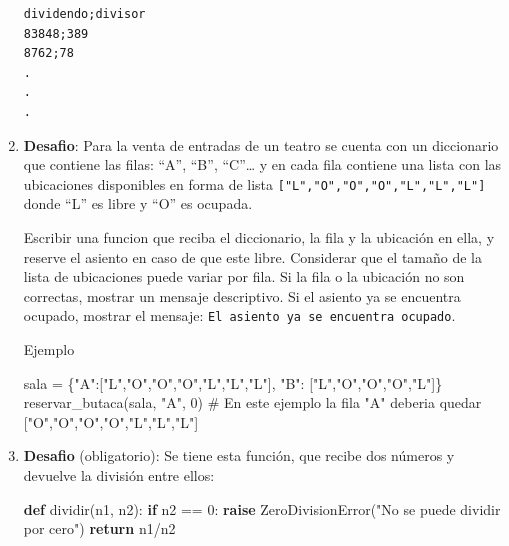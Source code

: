 \documentclass[
  letterpaper,
  DIV=11,
  numbers=noendperiod]{scrreprt}
\newenvironment{Shaded}{\begin{snugshade}}{\end{snugshade}}
\newcommand{\CommentTok}[1]{\textcolor[rgb]{0.37,0.37,0.37}{#1}}
\newcommand{\ControlFlowTok}[1]{\textcolor[rgb]{0.00,0.23,0.31}{\textbf{#1}}}
\newcommand{\DecValTok}[1]{\textcolor[rgb]{0.68,0.00,0.00}{#1}}
\newcommand{\KeywordTok}[1]{\textcolor[rgb]{0.00,0.23,0.31}{\textbf{#1}}}
\newcommand{\NormalTok}[1]{\textcolor[rgb]{0.00,0.23,0.31}{#1}}
\newcommand{\OperatorTok}[1]{\textcolor[rgb]{0.37,0.37,0.37}{#1}}
\newcommand{\PreprocessorTok}[1]{\textcolor[rgb]{0.68,0.00,0.00}{#1}}
\newcommand{\StringTok}[1]{\textcolor[rgb]{0.13,0.47,0.30}{#1}}
\begin{document}
\begin{enumerate}
\begin{verbatim}
dividendo;divisor
83848;389
8762;78
.
.
.
\end{verbatim}
\item
  \textbf{Desafio}: Para la venta de entradas de un teatro se cuenta con
  un diccionario que contiene las filas: ``A'', ``B'', ``C''\ldots{} y
  en cada fila contiene una lista con las ubicaciones disponibles en
  forma de lista \texttt{{[}"L","O","O","O","L","L","L"{]}} donde ``L''
  es libre y ``O'' es ocupada.~

  Escribir una funcion que reciba el diccionario, la fila y la ubicación
  en ella, y reserve el asiento en caso de que este libre. Considerar
  que el tamaño de la lista de ubicaciones puede variar por fila. Si la
  fila o la ubicación no son correctas, mostrar un mensaje descriptivo.
  Si el asiento ya se encuentra ocupado, mostrar el mensaje:
  \texttt{El\ asiento\ ya\ se\ encuentra\ ocupado}.

  Ejemplo

\begin{Shaded}
\begin{Highlighting}[]
\NormalTok{sala }\OperatorTok{=}\NormalTok{ \{}\StringTok{"A"}\NormalTok{:[}\StringTok{"L"}\NormalTok{,}\StringTok{"O"}\NormalTok{,}\StringTok{"O"}\NormalTok{,}\StringTok{"O"}\NormalTok{,}\StringTok{"L"}\NormalTok{,}\StringTok{"L"}\NormalTok{,}\StringTok{"L"}\NormalTok{], }\StringTok{"B"}\NormalTok{: [}\StringTok{"L"}\NormalTok{,}\StringTok{"O"}\NormalTok{,}\StringTok{"O"}\NormalTok{,}\StringTok{"O"}\NormalTok{,}\StringTok{"L"}\NormalTok{]\}}
\NormalTok{reservar\_butaca(sala, }\StringTok{"A"}\NormalTok{, }\DecValTok{0}\NormalTok{)}
\CommentTok{\# En este ejemplo la fila "A" deberia quedar ["O","O","O","O","L","L","L"]}
\end{Highlighting}
\end{Shaded}
\item
  \textbf{Desafio} (obligatorio): Se tiene esta función, que recibe dos
  números y devuelve la división entre ellos:

\begin{Shaded}
\begin{Highlighting}[]
\KeywordTok{def}\NormalTok{ dividir(n1, n2):}
    \ControlFlowTok{if}\NormalTok{ n2 }\OperatorTok{==} \DecValTok{0}\NormalTok{:}
        \ControlFlowTok{raise} \PreprocessorTok{ZeroDivisionError}\NormalTok{(}\StringTok{"No se puede dividir por cero"}\NormalTok{)}
    \ControlFlowTok{return}\NormalTok{ n1}\OperatorTok{/}\NormalTok{n2}
\end{Highlighting}
\end{Shaded}


\end{enumerate}
\end{document}
